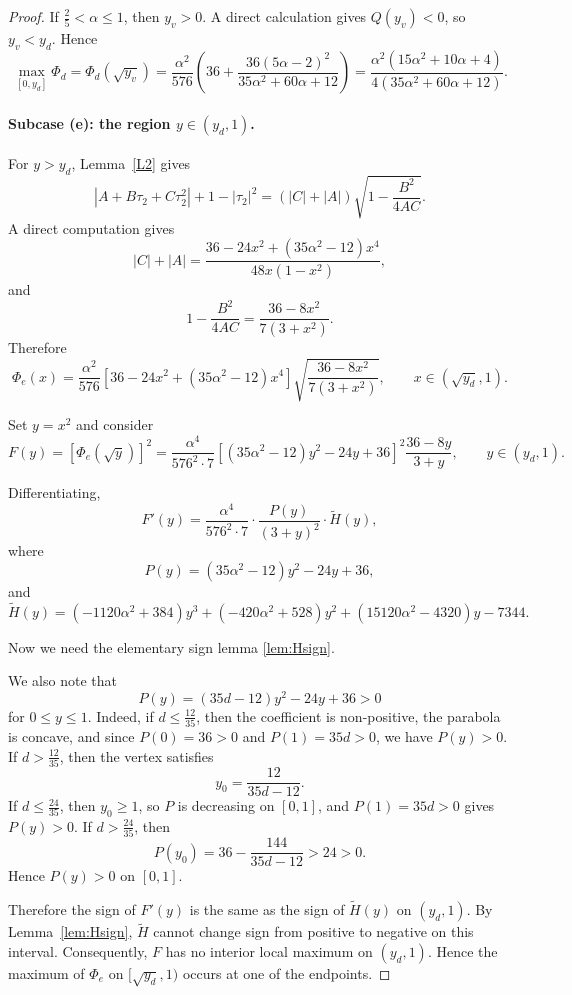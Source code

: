\documentclass[10pt,a4paper]{amsart}
\numberwithin{equation}{section}
\begin{document}
\begin{proof}
If $\frac25<\alpha\le 1$, then $y_v>0$. A direct calculation gives $Q(y_v)<0$, so $y_v<y_d$. Hence
\[
\max_{[0,y_d]}\Phi_d
=
\Phi_d(\sqrt{y_v})
=
\frac{\alpha^2}{576}
\left(
36+\frac{36(5\alpha-2)^2}{35\alpha^2+60\alpha+12}
\right)
=
\frac{\alpha^2(15\alpha^2+10\alpha+4)}
{4(35\alpha^2+60\alpha+12)}.
\]

\paragraph{Subcase (e): the region $y\in(y_d,1)$.}
For $y>y_d$, Lemma~\ref{L2} gives
\[
|A+B\tau_2+C\tau_2^2|+1-|\tau_2|^2
=
(|C|+|A|)\sqrt{1-\frac{B^2}{4AC}}.
\]
A direct computation gives
\[
|C|+|A|
=
\frac{36-24x^2+(35\alpha^2-12)x^4}{48x(1-x^2)},
\]
and
\[
1-\frac{B^2}{4AC}
=
\frac{36-8x^2}{7(3+x^2)}.
\]
Therefore
\begin{equation}\label{phi_e_correct}
\Phi_e(x)
=
\frac{\alpha^2}{576}
\left[
36-24x^2+(35\alpha^2-12)x^4
\right]
\sqrt{\frac{36-8x^2}{7(3+x^2)}},
\qquad x\in(\sqrt{y_d},1).
\end{equation}

Set $y=x^2$ and consider
\[
F(y)=[\Phi_e(\sqrt{y})]^2
=
\frac{\alpha^4}{576^2\cdot 7}
\left[
(35\alpha^2-12)y^2-24y+36
\right]^2
\frac{36-8y}{3+y},
\qquad y\in(y_d,1).
\]

Differentiating,
\[
F'(y)
=
\frac{\alpha^4}{576^2\cdot 7}
\cdot
\frac{P(y)}{(3+y)^2}
\cdot
\widetilde H(y),
\]
where
\[
P(y)=(35\alpha^2-12)y^2-24y+36,
\]
and
\begin{equation}\label{Htilde}
\widetilde H(y)
=
(-1120\alpha^2+384)y^3
+
(-420\alpha^2+528)y^2
+
(15120\alpha^2-4320)y
-
7344.
\end{equation}

Now we need the elementary sign lemma \eqref{lem:Hsign}.

We also note that
\[
P(y)=(35d-12)y^2-24y+36>0
\]
for $0\le y\le1$. Indeed, if $d\le \frac{12}{35}$, then the coefficient is non-positive, the parabola is concave, and since $P(0)=36>0$ and $P(1)=35d>0$, we have $P(y)>0$. If $d>\frac{12}{35}$, then the vertex satisfies
\[
y_0=\frac{12}{35d-12}.
\]
If $d\le \frac{24}{35}$, then $y_0\ge1$, so $P$ is decreasing on $[0,1]$, and $P(1)=35d>0$ gives $P(y)>0$. If $d>\frac{24}{35}$, then
\[
P(y_0)=36-\frac{144}{35d-12}>24>0.
\]
Hence $P(y)>0$ on $[0,1]$.

Therefore the sign of $F'(y)$ is the same as the sign of $\widetilde H(y)$ on $(y_d,1)$. By Lemma~\ref{lem:Hsign}, $\widetilde H$ cannot change sign from positive to negative on this interval. Consequently, $F$ has no interior local maximum on $(y_d,1)$. Hence the maximum of $\Phi_e$ on $[\sqrt{y_d},1)$ occurs at one of the endpoints.


\end{proof}
\end{document}
